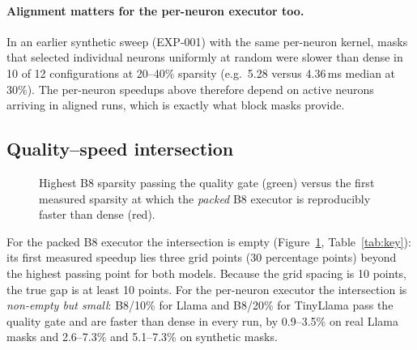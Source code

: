 \paragraph{Alignment matters for the per-neuron executor too.} In an earlier
synthetic sweep (EXP-001) with the same per-neuron kernel, masks that selected
individual neurons uniformly at random were slower than dense in 10 of 12
configurations at 20--40\% sparsity (e.g.\ 5.28 versus 4.36\,ms median at
30\%). The per-neuron speedups above therefore depend on active neurons
arriving in aligned runs, which is exactly what block masks provide.

\subsection{Quality--speed intersection}

\begin{figure}[t]
\centering

\caption{Highest B8 sparsity passing the quality gate (green) versus the first
measured sparsity at which the \emph{packed} B8 executor is reproducibly faster
than dense (red).}
\label{fig:frontier}
\end{figure}

\begin{table}[t]
\centering
\caption{B8 quality--speed frontier. The last column is the per-neuron
executor's speedup range at the quality ceiling (synthetic block-aligned
masks).}
\label{tab:key}
\small
\setlength{\tabcolsep}{4pt}

\end{table}

For the packed B8 executor the intersection is empty
(Figure~\ref{fig:frontier}, Table~\ref{tab:key}): its first measured speedup
lies three grid points (30 percentage points) beyond the highest passing
point for both models. Because the grid spacing is 10 points, the true gap is
at least 10 points. For the per-neuron executor the intersection is
\emph{non-empty but small}: B8/10\% for Llama and B8/20\% for TinyLlama pass
the quality gate and are faster than dense in every run, by 0.9--3.5\% on real
Llama masks and 2.6--7.3\% and 5.1--7.3\% on synthetic masks.
